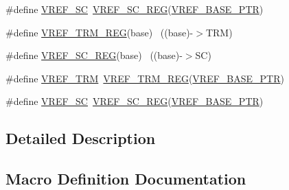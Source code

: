 \begin{DoxyCompactItemize}
\item 
\#define \hyperlink{group___v_r_e_f___register___accessor___macros_ga58353078d385155f1c55fad5802549bb}{V\+R\+E\+F\+\_\+\+SC}~\hyperlink{group___v_r_e_f___register___accessor___macros_gab8590b69eb308634188edd3d3f4bfbb6}{V\+R\+E\+F\+\_\+\+S\+C\+\_\+\+R\+EG}(\hyperlink{group___v_r_e_f___peripheral_ga53dba79dbefcdd6f788740a6d0caa57d}{V\+R\+E\+F\+\_\+\+B\+A\+S\+E\+\_\+\+P\+TR})
\item 
\#define \hyperlink{group___v_r_e_f___register___accessor___macros_ga58dc43651bdee9df31cca4b7cf50a2f1}{V\+R\+E\+F\+\_\+\+T\+R\+M\+\_\+\+R\+EG}(base)                                          ~((base)-\/$>$T\+RM)
\item 
\#define \hyperlink{group___v_r_e_f___register___accessor___macros_gab8590b69eb308634188edd3d3f4bfbb6}{V\+R\+E\+F\+\_\+\+S\+C\+\_\+\+R\+EG}(base)                                            ~((base)-\/$>$SC)
\item 
\#define \hyperlink{group___v_r_e_f___register___accessor___macros_ga3d9a836081732fa55a44bde53a2cb932}{V\+R\+E\+F\+\_\+\+T\+RM}~\hyperlink{group___v_r_e_f___register___accessor___macros_ga58dc43651bdee9df31cca4b7cf50a2f1}{V\+R\+E\+F\+\_\+\+T\+R\+M\+\_\+\+R\+EG}(\hyperlink{group___v_r_e_f___peripheral_ga53dba79dbefcdd6f788740a6d0caa57d}{V\+R\+E\+F\+\_\+\+B\+A\+S\+E\+\_\+\+P\+TR})
\item 
\#define \hyperlink{group___v_r_e_f___register___accessor___macros_ga58353078d385155f1c55fad5802549bb}{V\+R\+E\+F\+\_\+\+SC}~\hyperlink{group___v_r_e_f___register___accessor___macros_gab8590b69eb308634188edd3d3f4bfbb6}{V\+R\+E\+F\+\_\+\+S\+C\+\_\+\+R\+EG}(\hyperlink{group___v_r_e_f___peripheral_ga53dba79dbefcdd6f788740a6d0caa57d}{V\+R\+E\+F\+\_\+\+B\+A\+S\+E\+\_\+\+P\+TR})
\end{DoxyCompactItemize}


\subsection{Detailed Description}


\subsection{Macro Definition Documentation}
